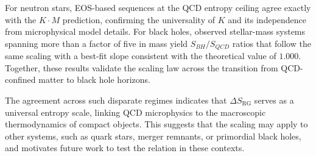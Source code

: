 \documentclass[aps,prd,onecolumn,nofootinbib,superscriptaddress]{revtex4-2}
\begin{document}
For neutron stars, EOS-based sequences at the QCD entropy ceiling agree exactly with the $K \cdot M$ prediction, confirming the universality of $K$ and its independence from microphysical model details. For black holes, observed stellar-mass systems spanning more than a factor of five in mass yield $S_{BH}/S_{QCD}$ ratios that follow the same scaling with a best-fit slope consistent with the theoretical value of $1.000$. Together, these results validate the scaling law across the transition from QCD-confined matter to black hole horizons.

The agreement across such disparate regimes indicates that $\Delta S_{\mathrm{RG}}$ serves as a universal entropy scale, linking QCD microphysics to the macroscopic thermodynamics of compact objects. This suggests that the scaling may apply to other systems, such as quark stars, merger remnants, or primordial black holes, and motivates future work to test the relation in these contexts.



\clearpage
\end{document}
